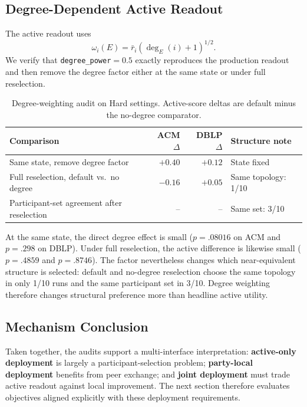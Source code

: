 \documentclass[letterpaper]{article}
\begin{document}
\subsection{Degree-Dependent Active Readout}

The active readout uses
\[
\omega_i(E)=\bar r_i(\deg_E(i)+1)^{1/2}.
\]
We verify that \texttt{degree\_power}$=0.5$ exactly reproduces the production
readout and then remove the degree factor either at the same state or under full
reselection.

\begin{table}[!t]
\centering
\scriptsize
\setlength{\tabcolsep}{3.4pt}
\caption{Degree-weighting audit on Hard settings. Active-score deltas are
default minus the no-degree comparator.}
\label{tab:supp-degree-decomposition}
\begin{tabular}{lrrl}
\toprule
Comparison & ACM $\Delta$ & DBLP $\Delta$ & Structure note \\
\midrule
Same state, remove degree factor & $+0.40$ & $+0.12$ & State fixed \\
Full reselection, default vs.\ no degree & $-0.16$ & $+0.05$ & Same topology: 1/10 \\
Participant-set agreement after reselection & -- & -- & Same set: 3/10 \\
\bottomrule
\end{tabular}
\end{table}

At the same state, the direct degree effect is small
($p=.08016$ on ACM and $p=.298$ on DBLP). Under full reselection, the active
difference is likewise small ($p=.4859$ and $p=.8746$). The factor nevertheless
changes which near-equivalent structure is selected: default and no-degree
reselection choose the same topology in only 1/10 runs and the same participant
set in 3/10. Degree weighting therefore changes structural preference more than
headline active utility.

\subsection{Mechanism Conclusion}

Taken together, the audits support a multi-interface interpretation:
\textbf{active-only deployment} is largely a participant-selection problem;
\textbf{party-local deployment} benefits from peer exchange; and
\textbf{joint deployment} must trade active readout against local improvement.
The next section therefore evaluates objectives aligned explicitly with these
deployment requirements.
\end{document}
